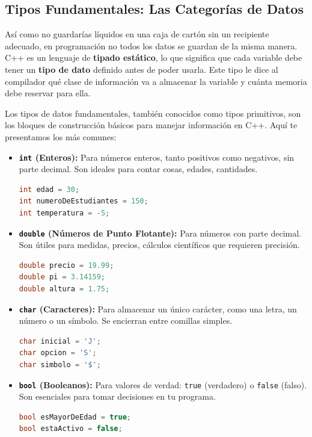 \subsection{Tipos Fundamentales: Las Categorías de Datos}
\label{subsec:tipos_fundamentales}

Así como no guardarías líquidos en una caja de cartón sin un recipiente adecuado, en programación no todos los datos se guardan de la misma manera. C++ es un lenguaje de \textbf{tipado estático}, lo que significa que cada variable debe tener un \textbf{tipo de dato} definido antes de poder usarla. Este tipo le dice al compilador qué clase de información va a almacenar la variable y cuánta memoria debe reservar para ella.

Los tipos de datos fundamentales, también conocidos como tipos primitivos, son los bloques de construcción básicos para manejar información en C++. Aquí te presentamos los más comunes:

\begin{itemize}
    \item \textbf{\texttt{int} (Enteros):} Para números enteros, tanto positivos como negativos, sin parte decimal. Son ideales para contar cosas, edades, cantidades.
    \begin{lstlisting}[language=C++]
int edad = 30;
int numeroDeEstudiantes = 150;
int temperatura = -5;
    \end{lstlisting}
    \item \textbf{\texttt{double} (Números de Punto Flotante):} Para números con parte decimal. Son útiles para medidas, precios, cálculos científicos que requieren precisión.
    \begin{lstlisting}[language=C++]
double precio = 19.99;
double pi = 3.14159;
double altura = 1.75;
    \end{lstlisting}
    \item \textbf{\texttt{char} (Caracteres):} Para almacenar un único carácter, como una letra, un número o un símbolo. Se encierran entre comillas simples.
    \begin{lstlisting}[language=C++]
char inicial = 'J';
char opcion = 'S';
char simbolo = '$';
    \end{lstlisting}
    \item \textbf{\texttt{bool} (Booleanos):} Para valores de verdad: \texttt{true} (verdadero) o \texttt{false} (falso). Son esenciales para tomar decisiones en tu programa.
    \begin{lstlisting}[language=C++]
bool esMayorDeEdad = true;
bool estaActivo = false;
    \end{lstlisting}
\end{itemize}

